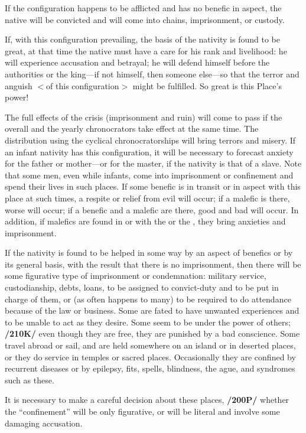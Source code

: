 If the configuration happens to be afflicted and has no benefic in aspect, the native will be convicted and will come into chains,
imprisonment, or custody. 

If, with this configuration prevailing, the basis of the nativity is found to be great, at that time the native must have a care for his rank and livelihood: he will experience accusation and betrayal; he will defend himself before the authorities or the king—if not himself, then someone else—so that the terror and anguish $<$of this configuration$>$ might be fulfilled. So great is this Place’s power!

The full effects of the crisis (imprisonment and ruin) will come to pass if the overall and the yearly chronocrators take effect at the same time. The distribution using the cyclical chronocratorships will bring terrors and misery. If an infant nativity has this configuration, it will be necessary to forecast anxiety for the father or mother—or for the master, if the nativity is that of a slave. Note that some men, even while infants, come into imprisonment or confinement and spend their lives in such places. If some benefic is in transit or in aspect with this place at such times, a respite or relief from evil will occur; if a malefic is there, worse will occur; if a benefic and a malefic are there, good and bad will occur. In addition, if malefics are found in \Opposition\xspace or \Square\xspace with the \Sun\xspace or the \Moon, they bring anxieties and imprisonment.

If the nativity is found to be helped in some way by an aspect of benefics or by its general basis, with the result that there is no imprisonment, then there will be some figurative type of imprisonment or condemnation: military service, custodianship, debts, loans, to be assigned to convict-duty and to be put in charge of them, or (as often happens to many) to be required to do attendance because of the law or business. Some are fated to have unwanted experiences and to be unable to act as they desire. Some seem to be under the power of others; \textbf{/210K/} even though they are free, they are punished by a bad conscience. Some travel abroad or sail, and are held somewhere on an island or in deserted places, or they do service in temples or sacred places. Occasionally they are confined by recurrent diseases or by epilepsy, fits, spells, blindness, the ague, and syndromes such as these. 

It is necessary to make a careful decision about these places, \textbf{/200P/} whether the “confinement” will be only figurative, or will be literal and involve some damaging accusation.

